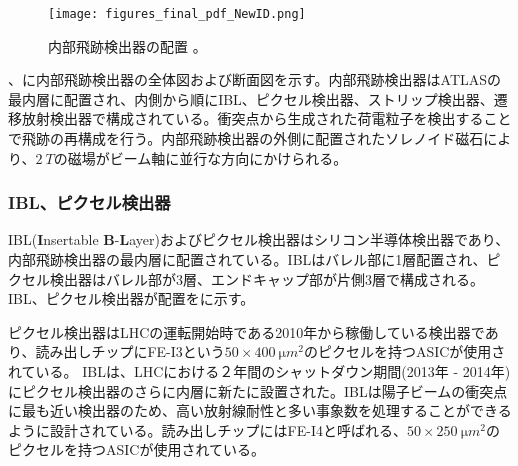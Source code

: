 \begin{figure}[tbp]
  \centering
  \texttt{[image: figures\_final\_pdf\_NewID.png]}
  \caption[内部飛跡検出器の配置]{内部飛跡検出器の配置 \cite{studyofID}。 }
  \label{fig:IDfigure}
\end{figure}


、に内部飛跡検出器の全体図および断面図を示す。内部飛跡検出器はATLASの最内層に配置され、内側から順にIBL、ピクセル検出器、ストリップ検出器、遷移放射検出器で構成されている。衝突点から生成された荷電粒子を検出することで飛跡の再構成を行う。内部飛跡検出器の外側に配置されたソレノイド磁石により、$2\ \si{T}$の磁場がビーム軸に並行な方向にかけられる。


\subsubsection{IBL、ピクセル検出器}
\label{sec:pixels}

IBL(\textbf{I}nsertable \textbf{B}-\textbf{L}ayer)およびピクセル検出器はシリコン半導体検出器であり、内部飛跡検出器の最内層に配置されている。IBLはバレル部に1層配置され、ピクセル検出器はバレル部が3層、エンドキャップ部が片側3層で構成される。IBL、ピクセル検出器が配置をに示す。

ピクセル検出器はLHCの運転開始時である2010年から稼働している検出器であり、読み出しチップにFE-I3という$50\times400\ \si{\micro m^2}$のピクセルを持つASICが使用されている。
IBLは、LHCにおける２年間のシャットダウン期間(2013年 - 2014年)にピクセル検出器のさらに内層に新たに設置された。IBLは陽子ビームの衝突点に最も近い検出器のため、高い放射線耐性と多い事象数を処理することができるように設計されている。読み出しチップにはFE-I4と呼ばれる、$50\times250\ \si{\micro m^2}$のピクセルを持つASICが使用されている。

